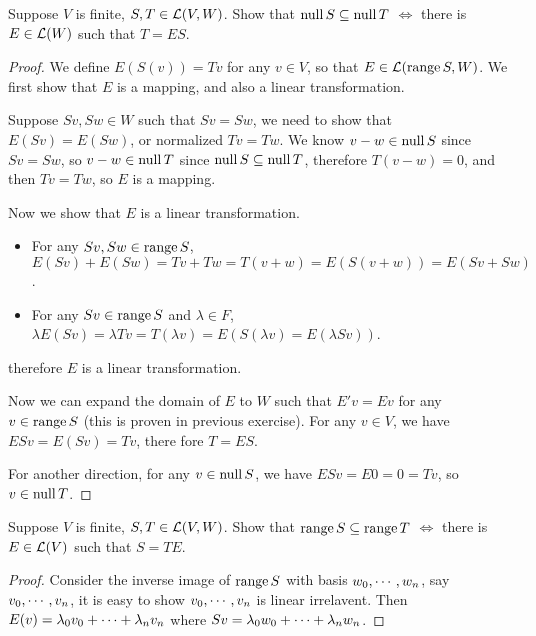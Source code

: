 \documentclass[../main.tex]{subfiles}
\begin{document}
\setcounter{exercise}{24}
\begin{exercise}
  Suppose $V$ is finite, $S, T \in \LT(V, W)$. Show that 
  $\nullv S \subseteq \nullv T$ $\iff$ there is $E \in \LT(W)$ such that $T = ES$.
\end{exercise}
\begin{proof}
  We define $E(S(v)) = Tv$ for any $v \in V$, so that $E \in \LT(\rangev S, W)$.
  We first show that $E$ is a mapping, and also a linear transformation.

  Suppose $Sv, Sw \in W$ such that $Sv = Sw$, we need to show that $E(Sv) = E(Sw)$,
  or normalized $Tv = Tw$.
  We know $v - w \in \nullv S$ since $Sv = Sw$, so $v - w \in \nullv T$
  since $\nullv S \subseteq \nullv T$, therefore $T(v - w) = 0$, and then $Tv = Tw$, so $E$ is a mapping.

  Now we show that $E$ is a linear transformation.
  \begin{itemize}
    \item For any $Sv, Sw \in \rangev S$, $E(Sv) + E(Sw) = Tv + Tw = T(v + w) = E(S(v + w)) = E(Sv + Sw)$.
    \item For any $Sv \in \rangev S$ and $\lambda \in F$, $\lambda E(Sv) = \lambda Tv = T(\lambda v) = E(S(\lambda v) = E(\lambda Sv))$.
  \end{itemize}
  therefore $E$ is a linear transformation.

  Now we can expand the domain of $E$ to $W$ such that $E'v = Ev$ for any $v \in \rangev S$
  (this is proven in previous exercise). For any $v \in V$, we have $ESv = E(Sv) = Tv$,
  there fore $T = ES$.

  For another direction, for any $v \in \nullv S$, we have $ESv = E0 = 0 = Tv$, so $v \in \nullv T$.
\end{proof}

\begin{exercise}
  Suppose $V$ is finite, $S, T \in \LT(V, W)$. Show that
  $\rangev S \subseteq \rangev T$ $\iff$ there is $E \in \LT(V)$ such that $S = TE$.
\end{exercise}
\begin{proof}
  Consider the inverse image of $\rangev S$ with basis $\join{w}{n}$,
  say $\join{v}{n}$,
  it is easy to show $\join{v}{n}$ is linear irrelavent.
  Then $E(v) = \joinp[+]{\lambda}{v}{n}$ where $Sv = \joinp[+]{\lambda}{w}{n}$.
\end{proof}
\end{document}
